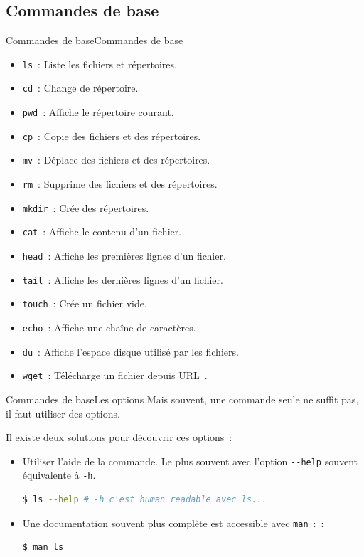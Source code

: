 \documentclass{beamer}
\begin{document}
    \subsection{Commandes de base}\label{subsec:commandes-de-base}

    \begin{frame}{Commandes de base}{Commandes de base}
        \begin{itemize}
            \item \lstinline{ls}~: Liste les fichiers et répertoires.
            \item \lstinline{cd}~: Change de répertoire.
            \item \lstinline{pwd}~: Affiche le répertoire courant.
            \item \lstinline{cp}~: Copie des fichiers et des répertoires.
            \item \lstinline{mv}~: Déplace des fichiers et des répertoires.
            \item \lstinline{rm}~: Supprime des fichiers et des répertoires.
            \item \lstinline{mkdir}~: Crée des répertoires.
            \item \lstinline{cat}~: Affiche le contenu d'un fichier.
            \item \lstinline{head}~: Affiche les premières lignes d'un fichier.
            \item \lstinline{tail}~: Affiche les dernières lignes d'un fichier.
            \item \lstinline{touch}~: Crée un fichier vide.
            \item \lstinline{echo}~: Affiche une chaîne de caractères.
            \item \lstinline{du}~: Affiche l'espace disque utilisé par les fichiers.
            \item \lstinline{wget}~: Télécharge un fichier depuis URL~.
        \end{itemize}
    \end{frame}

    \begin{frame}[fragile]{Commandes de base}{Les options}
        Mais souvent, une commande seule ne suffit pas, il faut utiliser des options.

        Il existe deux solutions pour découvrir ces options~:
        \begin{itemize}
            \item Utiliser l'aide de la commande.
            Le plus souvent avec l'option \lstinline{--help} souvent équivalente à \lstinline{-h}.
            \begin{lstlisting}[language=bash]
$ ls --help # -h c'est human readable avec ls...
            \end{lstlisting}
            \item Une documentation souvent plus complète est accessible avec \lstinline{man}~:~:
            \begin{lstlisting}[language=bash]
$ man ls
            \end{lstlisting}
        \end{itemize}
    \end{frame}
\end{document}
